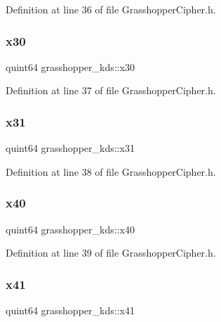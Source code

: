 Definition at line 36 of file Grasshopper\+Cipher.\+h.

\mbox{\label{structgrasshopper__kds_a45fbfa4e3b35447430c0808b3f9dbbfd}} 
\subsubsection{\texorpdfstring{x30}{x30}}
{\footnotesize\ttfamily quint64 grasshopper\+\_\+kds\+::x30}



Definition at line 37 of file Grasshopper\+Cipher.\+h.

\mbox{\label{structgrasshopper__kds_a9e17d4851aaac6ce22807dd9be0bcdfd}} 
\subsubsection{\texorpdfstring{x31}{x31}}
{\footnotesize\ttfamily quint64 grasshopper\+\_\+kds\+::x31}



Definition at line 38 of file Grasshopper\+Cipher.\+h.

\mbox{\label{structgrasshopper__kds_aef9bcd2ff66fd733d6bd4589e2913c61}} 
\subsubsection{\texorpdfstring{x40}{x40}}
{\footnotesize\ttfamily quint64 grasshopper\+\_\+kds\+::x40}



Definition at line 39 of file Grasshopper\+Cipher.\+h.

\mbox{\label{structgrasshopper__kds_a3aaf0b8a4427bb1c0fff3a0da8fe877a}} 
\subsubsection{\texorpdfstring{x41}{x41}}
{\footnotesize\ttfamily quint64 grasshopper\+\_\+kds\+::x41}



